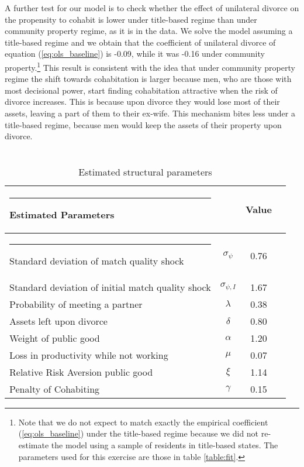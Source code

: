 \documentclass[12pt]{article}
\numberwithin{table}{section}
\begin{document}
A further test for our model is to check whether the effect of unilateral divorce on the propensity to cohabit is lower under title-based regime than under community property regime, as it is in the data. We solve the model assuming a title-based regime and we obtain that the coefficient of unilateral divorce of equation (\ref{eq:ols_baseline}) is -0.09, while it was -0.16 under community property.\footnote{Note that we do not expect to match exactly the empirical coefficient (\ref{eq:ols_baseline}) under the title-based regime because we did not re-estimate the model using a sample of residents in title-based states. The parameters used for this exercise are those in table \ref{table:fit}.} This result is consistent with the idea that under community property regime the shift towards cohabitation is larger because men, who are those with most decisional power, start finding cohabitation attractive when the risk of divorce increases. This is because upon divorce they would lose most of their assets, leaving a part of them to their ex-wife. This mechanism bites less under a title-based regime, because men would keep the assets of their property upon divorce.




\begin{table}[H]
\caption{\\Estimated structural parameters} %
\label{table:structural_params}
\centering %
\begin{threeparttable}
\begin{tabular}{@{\extracolsep{5pt}}lccc}   %
\hline \hline%
\rule{-4pt}{2.5ex}
Estimated Parameters &  & Value & \\ [0.45ex] %
\hline
\rule{-4pt}{2.5ex}
Standard deviation of match quality shock         & $\sigma_{\psi}$  & 0.76 &  \\[0.45ex]
Standard deviation of initial match quality shock & $\sigma_{\psi,I}$         & 1.67  &  \\[0.45ex]
Probability of meeting a partner               & $\lambda$       & 0.38 &\\[0.45ex]
Assets left upon divorce                                 & $\delta$             & 0.80  &  \\[0.45ex]
Weight of public good               & $\alpha$             & 1.20 & \\[0.45ex]
Loss in productivity while not working               & $\mu$             & 0.07 &  \\[0.45ex]
Relative Risk Aversion public good          &$\xi$   & 1.14& \\[0.45ex]
Penalty of Cohabiting          &$\gamma$   & 0.15&  \\[0.45ex]
\hline
\end{tabular}
\end{threeparttable}
\end{table}
\FloatBarrier
\end{document}
